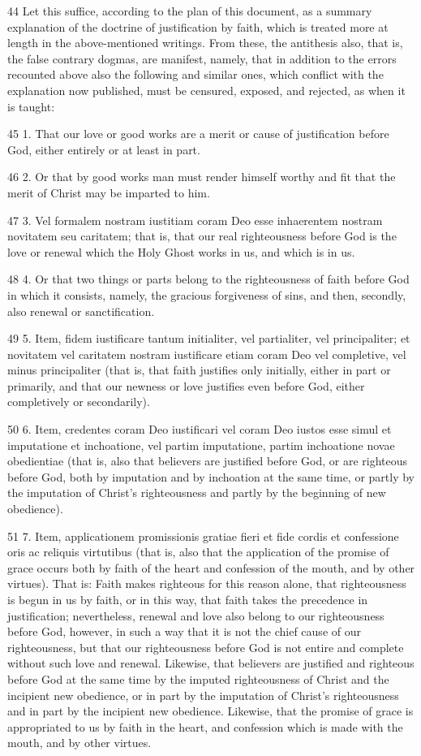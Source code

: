 44 Let this suffice, according to the plan of this document, as a summary explanation of the doctrine of justification by faith, which is treated more at length in the above-mentioned writings. From these, the antithesis also, that is, the false contrary dogmas, are manifest, namely, that in addition to the errors recounted above also the following and similar ones, which conflict with the explanation now published, must be censured, exposed, and rejected, as when it is taught:

45 1. That our love or good works are a merit or cause of justification before God, either entirely or at least in part.

46 2. Or that by good works man must render himself worthy and fit that the merit of Christ may be imparted to him.

47 3. Vel formalem nostram iustitiam coram Deo esse inhaerentem nostram novitatem seu caritatem; that is, that our real righteousness before God is the love or renewal which the Holy Ghost works in us, and which is in us.

48 4. Or that two things or parts belong to the righteousness of faith before God in which it consists, namely, the gracious forgiveness of sins, and then, secondly, also renewal or sanctification.

49 5. Item, fidem iustificare tantum initialiter, vel partialiter, vel principaliter; et novitatem vel caritatem nostram iustificare etiam coram Deo vel completive, vel minus principaliter (that is, that faith justifies only initially, either in part or primarily, and that our newness or love justifies even before God, either completively or secondarily).

50 6. Item, credentes coram Deo iustificari vel coram Deo iustos esse simul et imputatione et inchoatione, vel partim imputatione, partim inchoatione novae obedientiae (that is, also that believers are justified before God, or are righteous before God, both by imputation and by inchoation at the same time, or partly by the imputation of Christ’s righteousness and partly by the beginning of new obedience).

51 7. Item, applicationem promissionis gratiae fieri et fide cordis et confessione oris ac reliquis virtutibus (that is, also that the application of the promise of grace occurs both by faith of the heart and confession of the mouth, and by other virtues). That is: Faith makes righteous for this reason alone, that righteousness is begun in us by faith, or in this way, that faith takes the precedence in justification; nevertheless, renewal and love also belong to our righteousness before God, however, in such a way that it is not the chief cause of our righteousness, but that our righteousness before God is not entire and complete without such love and renewal. Likewise, that believers are justified and righteous before God at the same time by the imputed righteousness of Christ and the incipient new obedience, or in part by the imputation of Christ’s righteousness and in part by the incipient new obedience. Likewise, that the promise of grace is appropriated to us by faith in the heart, and confession which is made with the mouth, and by other virtues.

